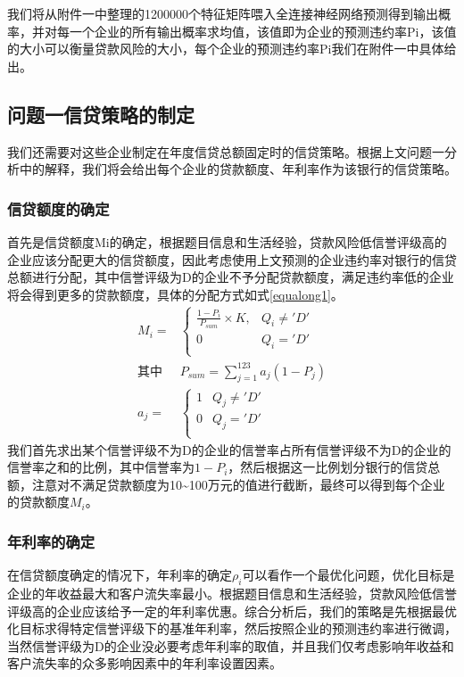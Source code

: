 \documentclass{cumcmthesis}
\begin{document}
我们将从附件一中整理的1200000个特征矩阵喂入全连接神经网络预测得到输出概率，并对每一个企业的所有输出概率求均值，该值即为企业的预测违约率Pi，该值的大小可以衡量贷款风险的大小，每个企业的预测违约率Pi我们在附件一中具体给出。

\subsection{问题一信贷策略的制定}
我们还需要对这些企业制定在年度信贷总额固定时的信贷策略。根据上文问题一分析中的解释，我们将会给出每个企业的贷款额度、年利率作为该银行的信贷策略。
\subsubsection{信贷额度的确定}
首先是信贷额度Mi的确定，根据题目信息和生活经验，贷款风险低信誉评级高的企业应该分配更大的信贷额度，因此考虑使用上文预测的企业违约率对银行的信贷总额进行分配，其中信誉评级为D的企业不予分配贷款额度，满足违约率低的企业将会得到更多的贷款额度，具体的分配方式如式\ref{equalong1}。
\begin{equation}
\begin{split}
M_i=&
\begin{cases}
\frac{1-P_i}{P_{sum}}\times K, & Q_i \ne 'D'\\
0 & Q_i = 'D' \\
\end{cases} \\
\mbox{其中} &  P_{sum} = \sum_{j=1}^{123} a_j (1-P_j) \\
 a_j =& 
\begin{cases}
1 & Q_j \ne 'D' \\
0 & Q_j = 'D'\\
\end{cases}
\end{split}
\label{equalong1}
\end{equation}
我们首先求出某个信誉评级不为D的企业的信誉率占所有信誉评级不为D的企业的信誉率之和的比例，其中信誉率为$1-P_i$，然后根据这一比例划分银行的信贷总额，注意对不满足贷款额度为10\textasciitilde 100万元的值进行截断，最终可以得到每个企业的贷款额度$M_i$。
\subsubsection{年利率的确定}
在信贷额度确定的情况下，年利率的确定$\rho_i$可以看作一个最优化问题，优化目标是企业的年收益最大和客户流失率最小。根据题目信息和生活经验，贷款风险低信誉评级高的企业应该给予一定的年利率优惠。综合分析后，我们的策略是先根据最优化目标求得特定信誉评级下的基准年利率，然后按照企业的预测违约率进行微调，当然信誉评级为D的企业没必要考虑年利率的取值，并且我们仅考虑影响年收益和客户流失率的众多影响因素中的年利率设置因素。
\end{document}

